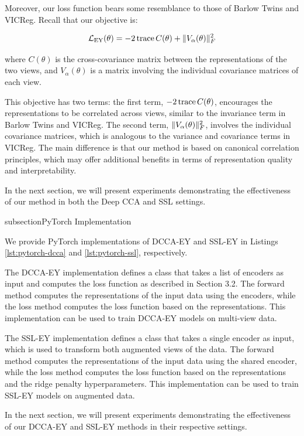 Moreover, our loss function bears some resemblance to those of Barlow Twins and VICReg. Recall that our objective is:

\begin{align*}
\mathcal{L}_\text{EY}(\theta) = - 2 \operatorname{trace} C(\theta) + \lVert V_\alpha(\theta)\rVert_F^2
\end{align*}

where $C(\theta)$ is the cross-covariance matrix between the representations of the two views, and $V_\alpha(\theta)$ is a matrix involving the individual covariance matrices of each view.

This objective has two terms: the first term, $- 2 \operatorname{trace} C(\theta)$, encourages the representations to be correlated across views, similar to the invariance term in Barlow Twins and VICReg. The second term, $\lVert V_\alpha(\theta)\rVert_F^2$, involves the individual covariance matrices, which is analogous to the variance and covariance terms in VICReg. The main difference is that our method is based on canonical correlation principles, which may offer additional benefits in terms of representation quality and interpretability.

In the next section, we will present experiments demonstrating the effectiveness of our method in both the Deep CCA and SSL settings.

subsection{PyTorch Implementation}

We provide PyTorch implementations of DCCA-EY and SSL-EY in Listings \ref{lst:pytorch-dcca} and \ref{lst:pytorch-ssl}, respectively.

The DCCA-EY implementation defines a class that takes a list of encoders as input and computes the loss function as described in Section 3.2. The forward method computes the representations of the input data using the encoders, while the loss method computes the loss function based on the representations. This implementation can be used to train DCCA-EY models on multi-view data.

The SSL-EY implementation defines a class that takes a single encoder as input, which is used to transform both augmented views of the data. The forward method computes the representations of the input data using the shared encoder, while the loss method computes the loss function based on the representations and the ridge penalty hyperparameters. This implementation can be used to train SSL-EY models on augmented data.

In the next section, we will present experiments demonstrating the effectiveness of our DCCA-EY and SSL-EY methods in their respective settings.


